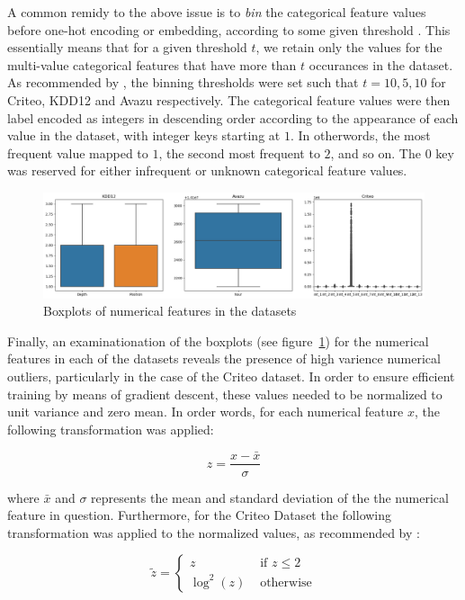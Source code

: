 \documentclass{mldsmsc}
\begin{document}
A common remidy to the above issue is to \emph{bin} the categorical feature 
values before one-hot encoding or embedding, according to some given 
threshold \citep{RefWorks:song2019autoint}. This essentially means that for a 
given threshold $t$, we retain only the values for the multi-value 
categorical features that have more than $t$ occurances in the dataset. As recommended by
\cite{RefWorks:song2019autoint}, the binning thresholds were set such that
$t = {10,5,10}$ for Criteo, KDD12 and Avazu respectively. The categorical
feature values were then label encoded as integers in descending order according
to the appearance of each value in the dataset, with integer keys starting
at $1$. In otherwords, the most frequent value mapped to $1$, the second most frequent
to $2$, and so on. The $0$ key was reserved for either infrequent or unknown categorical
feature values.

\begin{figure}[h]
    \centering
    \includegraphics[width=\textwidth]{../figures/numerical_boxplots.png}
    \caption{Boxplots of numerical features in the datasets}
    \label{fig:boxplots}
\end{figure}

Finally, an examinationation of the boxplots (see figure~\ref{fig:boxplots}) for the numerical features in
each of the datasets reveals the presence of high varience numerical outliers,
particularly in the case of the Criteo dataset. In order to ensure efficient
training by means of gradient descent, these values needed to be normalized to unit
variance and zero mean. In order words, for each numerical feature $x$,
the following transformation was applied:

$$
z = \frac{x - \bar{x}}{\sigma}
$$

where $\bar{x}$ and $\sigma$ represents the mean and standard deviation of the
the numerical feature in question. Furthermore, for the Criteo Dataset the following
transformation was applied to the normalized values, as recommended by \cite{RefWorks:song2019autoint}:

\begin{equation*}
\tilde{z} = \begin{cases} z & \text{ if } z \leq 2 \\
    \log^{2}(z) & \text{ otherwise}
\end{cases}
\end{equation*}
\end{document}
